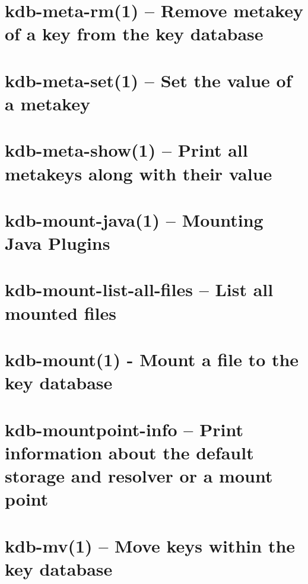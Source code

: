 \let\mypdfximage\pdfximage\def\pdfximage{\immediate\mypdfximage}\documentclass[twoside]{book}
\newcommand{\+}{\discretionary{\mbox{\scriptsize$\hookleftarrow$}}{}{}}
\begin{document}
\chapter{kdb-\/meta-\/rm(1) -- Remove metakey of a key from the key database}
\label{doc_help_kdb-meta-rm_md}

\chapter{kdb-\/meta-\/set(1) -- Set the value of a metakey}
\label{doc_help_kdb-meta-set_md}

\chapter{kdb-\/meta-\/show(1) -- Print all metakeys along with their value}
\label{doc_help_kdb-meta-show_md}

\chapter{kdb-\/mount-\/java(1) -- Mounting Java Plugins}
\label{doc_help_kdb-mount-java_md}

\chapter{kdb-\/mount-\/list-\/all-\/files -- List all mounted files}
\label{doc_help_kdb-mount-list-all-files_md}

\chapter{kdb-\/mount(1) -\/ Mount a file to the key database}
\label{doc_help_kdb-mount_md}

\chapter{kdb-\/mountpoint-\/info -- Print information about the default storage and resolver or a mount point}
\label{doc_help_kdb-mountpoint-info_md}

\chapter{kdb-\/mv(1) -- Move keys within the key database}
\label{doc_help_kdb-mv_md}

\end{document}
